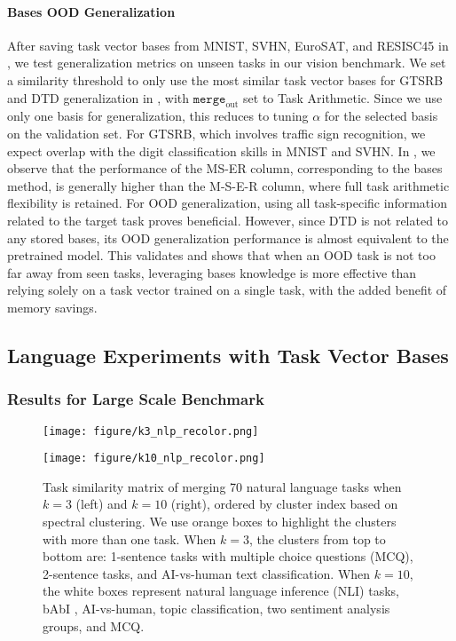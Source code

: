 \paragraph{Bases OOD Generalization}
After saving task vector bases from MNIST, SVHN, EuroSAT, and RESISC45 in , we test generalization metrics on unseen tasks in our vision benchmark. We set a similarity threshold to only use the most similar task vector bases for GTSRB and DTD generalization in , with $\texttt{merge}_\text{out}$ set to Task Arithmetic. Since we use only one basis for generalization, this reduces to tuning $\alpha$ for the selected basis on the validation set. For GTSRB, which involves traffic sign recognition, we expect overlap with the digit classification skills in MNIST and SVHN. In , we observe that the performance of the MS-ER column, corresponding to the bases method, is generally higher than the M-S-E-R column, where full task arithmetic flexibility is retained. For OOD generalization, using all task-specific information related to the target task proves beneficial. However, since DTD is not related to any stored bases, its OOD generalization performance is almost equivalent to the pretrained model. This validates  and shows that when an OOD task is not too far away from seen tasks, leveraging bases knowledge is more effective than relying solely on a task vector trained on a single task, with the added benefit of memory savings.




\subsection{Language Experiments with Task Vector Bases}
\label{sec:basis-exp-nlp}
\subsubsection{Results for Large Scale Benchmark}
\begin{figure}[!ht]
    \centering
    \begin{minipage}[b]{0.23\textwidth}
        \centering
        \texttt{[image: figure/k3\_nlp\_recolor.png]} 
    \end{minipage}
    \hfill
    \begin{minipage}[b]{0.23\textwidth}
        \centering
        \texttt{[image: figure/k10\_nlp\_recolor.png]} 
    \end{minipage}
    \caption{Task similarity matrix of merging 70 natural language tasks when $k = 3$ (left) and $k = 10$ (right), ordered by cluster index based on spectral clustering. We use orange boxes to highlight the clusters with more than one task. When $k = 3$, the clusters from top to bottom are: 1-sentence tasks with multiple choice questions (MCQ), 2-sentence tasks, and AI-vs-human text classification. When $k = 10$, the white boxes represent natural language inference (NLI) tasks, bAbI \citep{weston2015towards}, AI-vs-human, topic classification, two sentiment analysis groups, and MCQ.}
    \label{fig:nlp_cluster}
\end{figure}

